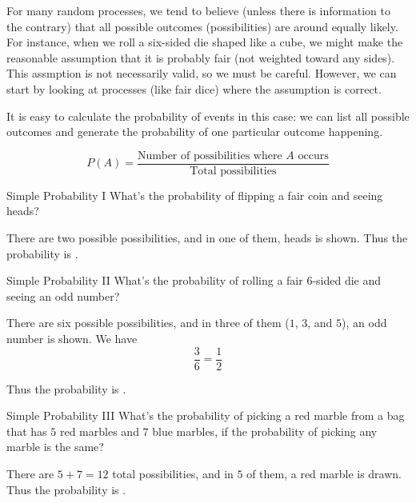\documentclass[a4paper,10pt]{report}
\begin{document}
For many random processes, we tend to believe (unless there is information to the contrary)
that all possible outcomes (possibilities) are around equally likely. For instance, when we
roll a six-sided die shaped like a cube, we might make the reasonable assumption that it is
probably fair (not weighted toward any sides). This assmption is not necessarily valid, so
we must be careful. However, we can start by looking at processes (like fair dice) where the
assumption is correct.

It is easy to calculate the probability of events in this case: we can list all possible
outcomes and generate the probability of one particular outcome happening.

\begin{equation}
 P(A) = \frac{\text{Number of possibilities where \(A\) occurs}}
 {\text{Total possibilities}}
\end{equation}

\begin{problem}{Simple Probability I}
 What's the probability of flipping a fair coin and seeing heads?

 \begin{solution}
  There are two possible possibilities, and in one of them, heads is shown. Thus
  the probability is .
 \end{solution}
\end{problem}

\begin{problem}{Simple Probability II}
 What's the probability of rolling a fair \(6\)-sided die and seeing an odd
 number?

 \begin{solution}
  There are six possible possibilities, and in three of them (\(1\), \(3\), and \(5\)), an
  odd number is shown. We have \[
   \frac{3}{6} = \frac{1}{2}
  \]

  Thus the probability is .
 \end{solution}
\end{problem}

\begin{problem}{Simple Probability III}
 What's the probability of picking a red marble from a bag that has \(5\) red marbles and
 \(7\) blue marbles, if the probability of picking any marble is the same?

 \begin{solution}
  There are \(5+7=12\) total possibilities, and in \(5\) of them, a red marble is drawn.
  Thus the probability is .
 \end{solution}
\end{problem}
\end{document}
